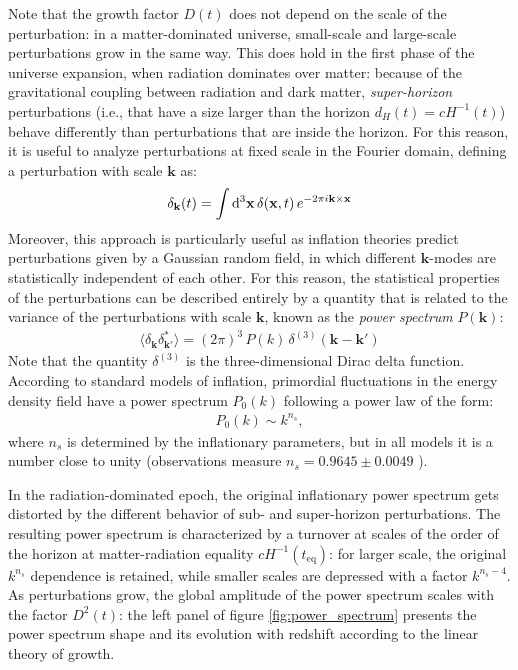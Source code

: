  Note that the growth factor $D(t)$ does not depend on the scale of the perturbation: in a matter-dominated universe, small-scale and large-scale perturbations grow in the same way. This does hold in the first phase of the universe expansion, when radiation dominates over matter: because of the gravitational coupling between radiation and dark matter, \textit{super-horizon} perturbations (i.e., that have a size larger than the horizon $d_H(t) = cH^{-1}(t)$) behave differently than perturbations that are inside the horizon. For this reason, it is useful to analyze perturbations at fixed scale in the Fourier domain, defining a perturbation with scale $\mathbf{k}$ as:
 \begin{align}
    \delta_\mathbf{k}(t) = \int \mathrm{d}^3\mathbf{x}\, \delta(\mathbf{x},t) \,e^{-2\pi i \mathbf{k}\times\mathbf{x}}
 \end{align}
 Moreover, this approach is particularly useful as inflation theories predict perturbations given by a Gaussian random field, in which different $\mathbf{k}$-modes are statistically independent of each other. For this reason, the statistical properties of the perturbations can be described entirely by a quantity that is related to the variance of the perturbations with scale $\mathbf{k}$, known as the \textit{power spectrum} $P(\mathbf{k})$:
 \begin{align}
    \langle \delta_\mathbf{k} \delta^*_\mathbf{k'} \rangle = (2\pi)^3 \,P(k)\, \delta^{(3)}(\mathbf{k}-\mathbf{k'})
 \end{align}
 Note that the quantity $\delta^{(3)}$ is the three-dimensional Dirac delta function. According to standard models of inflation, primordial fluctuations in the energy density field have a power spectrum $P_0(k)$ following a power law of the form:
  \begin{align}
   P_0(k) \sim k^{n_s},  
  \end{align}
 where $n_s$ is determined by the inflationary parameters, but in all models it is a number close to unity (observations measure $n_s = 0.9645 \pm 0.0049$ \citep{2016planck}). 
 
 In the radiation-dominated epoch, the original inflationary power spectrum gets distorted by the different behavior of sub- and super-horizon perturbations. The resulting power spectrum is characterized by a turnover at scales of the order of the horizon at matter-radiation equality $cH^{-1}(t_\mathrm{eq})$: for larger scale, the original $k^{n_s}$ dependence is retained, while smaller scales are depressed with a factor $k^{n_s-4}$. As perturbations grow, the global amplitude of the power spectrum scales with the factor $D^2(t)$: the left panel of figure \ref{fig:power_spectrum} presents the power spectrum shape and its evolution with redshift according to the linear theory of growth. 
 
